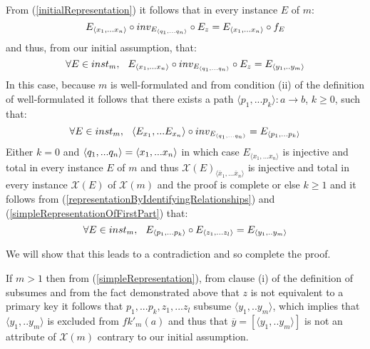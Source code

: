 \documentclass[10pt,a4paper]{article}
\newcommand{\genericmodel}{\mathcal{M}}
\renewcommand{\genericmodel}{{m}}
\newcommand{\fkp}[2] [\genericmodel]{fk'_{#1}(#2)}
\newcommand{\logtophys}{\mathcal{X}}
\newcommand{\phys}[1]{\overline{#1}}
\newcommand{\genericphysical}{\logtophys(\genericmodel)}
\newcommand{\ntuple}[1]{\tuple{#1_1,...#1_n}}
\newcommand {\qntuple}{\ensuremath{\ntuple{q}}}
\begin{document}
\noindent From (\ref{initialRepresentation}) it follows that in every instance $E$ of $\genericmodel$:  
\begin{equation*}
E_{\langle x_1,...x_n \rangle}\circ inv_{E_{\qntuple}} \circ E_{z}  = E_{\langle x_1,...x_n \rangle} \circ f_E 
\end{equation*}
\noindent and thus, from our initial assumption, that:
\begin{equation}
\label{representationByIdentifyingRelationships}
\ineveryinstance E_{\langle x_1,...x_n \rangle}\circ inv_{E_{\qntuple}} \circ E_{z} = E_{\langle y_1,..y_m \rangle} 
\end{equation}
\noindent In this case, because $\genericmodel$ is well-formulated and from condition (ii) of the definition of well-formulated it follows that there exists
a path $\langle p_1,...p_k \rangle:a \rightarrow b$, $k \geq 0$, such that:
\begin{equation}
\label{simpleRepresentationOfFirstPart}
\ineveryinstance \langle E_{x_1},...E_{x_n} \rangle \circ inv_{E_{\qntuple}} = E_{\langle p_1,...p_k \rangle}
\end{equation}
\noindent Either $k=0$ and $\qntuple = \langle x_1,...x_n \rangle$ in which case $E_{\langle x_1,...x_n \rangle}$ is
injective and total in every instance $E$ of $\genericmodel$ and thus $\logtophys(E)_{\langle \phys{x}_1,...\phys{x}_n \rangle}$ is
injective and total in every instance $\logtophys(E)$ of $\genericphysical$ and the proof is complete 
\noindent or else $k \geq 1$ and it follows from (\ref{representationByIdentifyingRelationships}) and (\ref{simpleRepresentationOfFirstPart}) that:
\begin{equation} 
\label{simpleRepresentation}
\ineveryinstance  E_{\langle p_1,...p_k \rangle} \circ E_{\langle z_1,...z_l \rangle} = E_{\langle y_1,..y_m \rangle} 
\end{equation}


We will show that this leads to a contradiction and so complete the proof. 

If $m >1$ then
 from  (\ref{simpleRepresentation}),
from clause (i) of the definition of subsumes and from the fact demonstrated above that $z$ is not equivalent to a primary key 
it follows that $p_1,...p_k,z_1,...z_l$ subsume $\langle y_1,..y_m \rangle$, 
which implies that $\langle y_1,..y_m \rangle$ is excluded from $\fkp{a}$ and thus that 
 $\phys{y}=\left[\langle y_1,..y_m \rangle\right]$ is not an attribute of $\genericphysical$ contrary to our 
initial assumption. 
\end{document}
